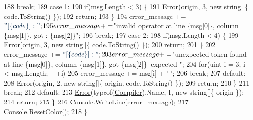 \begin{DoxyCode}
188                                     \textcolor{keywordflow}{break};
189                                 \textcolor{keywordflow}{case} 1:
190                                     \textcolor{keywordflow}{if}(msg.Length < 3) \{
191                                         \mbox{\hyperlink{class_compiler_1_1_compiler_af3467c4a37bb5379d3da14188042193c}{Error}}(origin, 3, \textcolor{keyword}{new} \textcolor{keywordtype}{string}[]\{ code.ToString() \});
192                                         \textcolor{keywordflow}{return};
193                                     \}
194                                     error\_message += $\textcolor{stringliteral}{"[\{code\}] : "};
195                                     error\_message += $\textcolor{stringliteral}{"invalid operator at line \{msg[0]\}, column \{msg[1]\},
       got : \{msg[2]\}"};
196                                     \textcolor{keywordflow}{break};
197                                 \textcolor{keywordflow}{case} 2:
198                                     \textcolor{keywordflow}{if}(msg.Length < 4) \{
199                                         \mbox{\hyperlink{class_compiler_1_1_compiler_af3467c4a37bb5379d3da14188042193c}{Error}}(origin, 3, \textcolor{keyword}{new} \textcolor{keywordtype}{string}[]\{ code.ToString() \});
200                                         \textcolor{keywordflow}{return};
201                                     \}
202                                     error\_message += $\textcolor{stringliteral}{"[\{code\}] : "};
203                                     error\_message += $\textcolor{stringliteral}{"unexpected token found at line \{msg[0]\}, column
       \{msg[1]\}, got \{msg[2]\}, expected "};
204                                     \textcolor{keywordflow}{for}(uint i = 3; i < msg.Length; ++i)
205                                         error\_message += msg[i] + \textcolor{charliteral}{' '};
206                                     \textcolor{keywordflow}{break};
207                                 \textcolor{keywordflow}{default}:
208                                     \mbox{\hyperlink{class_compiler_1_1_compiler_af3467c4a37bb5379d3da14188042193c}{Error}}(origin, 2, \textcolor{keyword}{new} \textcolor{keywordtype}{string}[]\{ origin, code.ToString() \});
209                                     \textcolor{keywordflow}{return};
210                             \}
211                             \textcolor{keywordflow}{break};
212                         \textcolor{keywordflow}{default}:
213                             \mbox{\hyperlink{class_compiler_1_1_compiler_af3467c4a37bb5379d3da14188042193c}{Error}}(typeof(\mbox{\hyperlink{namespace_compiler}{Compiler}}).Name, 1, \textcolor{keyword}{new} \textcolor{keywordtype}{string}[]\{ origin \});
214                             \textcolor{keywordflow}{return};
215                     \}
216                     Console.WriteLine(error\_message);
217                     Console.ResetColor();
218                 \}
\end{DoxyCode}
\mbox{\label{class_compiler_1_1_compiler_a1c4bba751de5a1ac6db0006cb6203ed4}} 
